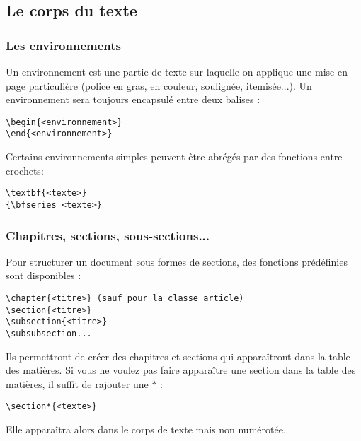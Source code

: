 \documentclass{beamer}
\begin{document}
\subsection[Corps]{Le corps du texte}
\begin{frame}[fragile]
	\frametitle{Les environnements}
	Un environnement est une partie de texte sur laquelle on applique une mise en page particulière (police en gras, en couleur, soulignée, itemisée...). Un environnement sera toujours encapsulé entre deux balises :
	\begin{Verbatim}
\begin{<environnement>}
\end{<environnement>}
	\end{Verbatim}
	\vspace{0.2cm}
	Certains environnements simples peuvent être abrégés par des fonctions entre crochets:
	\begin{Verbatim}
\textbf{<texte>}
{\bfseries <texte>}
	\end{Verbatim}
\end{frame}

\begin{frame}[fragile]
	\frametitle{Chapitres, sections, sous-sections...}
	Pour structurer un document sous formes de sections, des fonctions prédéfinies sont disponibles :
	\begin{Verbatim}
\chapter{<titre>} (sauf pour la classe article)
\section{<titre>}
\subsection{<titre>}
\subsubsection...
	\end{Verbatim}
	\vspace{0.3cm}
	Ils permettront de créer des chapitres et sections qui apparaîtront dans la table des matières. Si vous ne voulez pas faire apparaître une section dans la table des matières, il suffit de rajouter une $\ast$ : \vspace{-0.6cm}
	\begin{Verbatim}
\section*{<texte>}
	\end{Verbatim}
	Elle apparaîtra alors dans le corps de texte mais non numérotée.
\end{frame}
\end{document}
